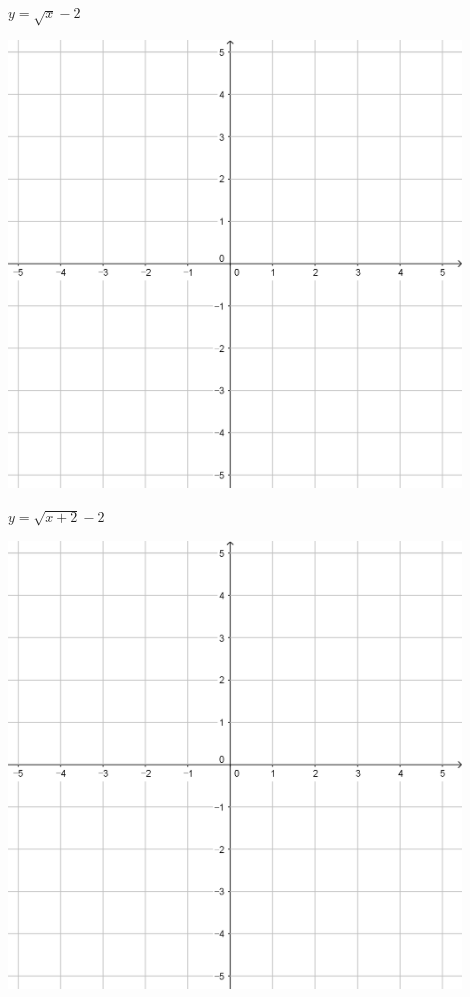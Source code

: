 \documentclass[a4paper]{oblivoir}
\begin{document}
\begin{minipage}{0.45\textwidth}\centering
\(y=\sqrt{x}-2\)
\par\bigskip\includegraphics[width=0.9\textwidth]{55}
\end{minipage}
\begin{minipage}{0.45\textwidth}\centering
\(y=\sqrt{x+2}-2\)
\par\bigskip\includegraphics[width=0.9\textwidth]{55}
\end{minipage}\bigskip\bigskip\par
\end{document}
